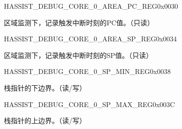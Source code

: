 \begin{register}{H}{ASSIST\_DEBUG\_CORE\_0\_AREA\_PC\_REG}{0x0030}\label{regdesc:ASSISTDEBUGCORE0AREAPCREG}
%
\regnewline%
\begin{regdesc}\begin{reglist}
\label{fielddesc:ASSISTDEBUGCORE0AREAPC}\item [ASSIST\_DEBUG\_CORE\_0\_AREA\_PC] 区域监测下，记录触发中断时刻的PC值。（只读）
\end{reglist}\end{regdesc}
\end{register}


\begin{register}{H}{ASSIST\_DEBUG\_CORE\_0\_AREA\_SP\_REG}{0x0034}\label{regdesc:ASSISTDEBUGCORE0AREASPREG}
%
\regnewline%
\begin{regdesc}\begin{reglist}
\label{fielddesc:ASSISTDEBUGCORE0AREASP}\item [ASSIST\_DEBUG\_CORE\_0\_AREA\_SP] 区域监测下，记录触发中断时刻的SP值。（只读）
\end{reglist}\end{regdesc}
\end{register}


\begin{register}{H}{ASSIST\_DEBUG\_CORE\_0\_SP\_MIN\_REG}{0x0038}\label{regdesc:ASSISTDEBUGCORE0SPMINREG}
%
\regnewline%
\begin{regdesc}\begin{reglist}
\label{fielddesc:ASSISTDEBUGCORE0SPMIN}\item [ASSIST\_DEBUG\_CORE\_0\_SP\_MIN] 栈指针的下边界。（读/写）
\end{reglist}\end{regdesc}
\end{register}


\begin{register}{H}{ASSIST\_DEBUG\_CORE\_0\_SP\_MAX\_REG}{0x003C}\label{regdesc:ASSISTDEBUGCORE0SPMAXREG}
%
\regnewline%
\begin{regdesc}\begin{reglist}
\label{fielddesc:ASSISTDEBUGCORE0SPMAX}\item [ASSIST\_DEBUG\_CORE\_0\_SP\_MAX] 栈指针的上边界。（读/写）
\end{reglist}\end{regdesc}
\end{register}


